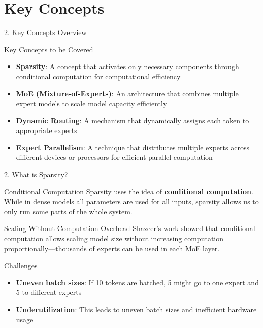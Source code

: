\documentclass[11pt]{beamer}
\begin{document}
\section{Key Concepts}
\begin{frame}{2. Key Concepts Overview}
    \begin{block}{Key Concepts to be Covered}
    \begin{itemize}
        \item \textbf{Sparsity}: A concept that activates only necessary components through conditional computation for computational efficiency
        \item \textbf{MoE (Mixture-of-Experts)}: An architecture that combines multiple expert models to scale model capacity efficiently
        \item \textbf{Dynamic Routing}: A mechanism that dynamically assigns each token to appropriate experts
        \item \textbf{Expert Parallelism}: A technique that distributes multiple experts across different devices or processors for efficient parallel computation
    \end{itemize}
    \end{block}
    
\end{frame}

\begin{frame}{2. What is Sparsity?}
    \begin{block}{Conditional Computation}
    Sparsity uses the idea of \textbf{conditional computation}. While in dense models all parameters are used for all inputs, sparsity allows us to only run some parts of the whole system.
    \end{block}
    
    \begin{block}{Scaling Without Computation Overhead}
    Shazeer's work showed that conditional computation allows scaling model size without increasing computation proportionally—thousands of experts can be used in each MoE layer.
    \end{block}
    
    \begin{alertblock}{Challenges}
    \begin{itemize}
        \item \textbf{Uneven batch sizes}: If 10 tokens are batched, 5 might go to one expert and 5 to different experts
        \item \textbf{Underutilization}: This leads to uneven batch sizes and inefficient hardware usage
    \end{itemize}
    \end{alertblock}
\end{frame}
\end{document}
